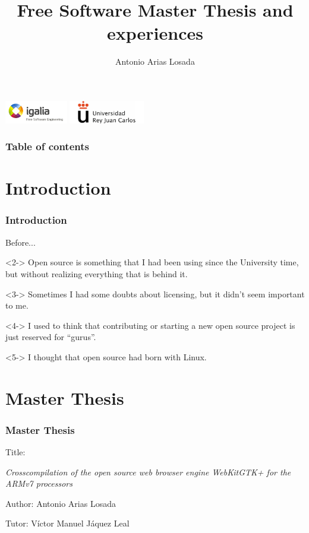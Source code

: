 \documentclass[slidestop,compress,mathserif]{beamer}
\title[Master Thesis and experiences]
{Free Software Master Thesis and experiences}
\author[Autores abreviados]{Antonio Arias Losada}
\institute{Free Software Master - 2011/2012}
\begin{document}
\begin{frame}
  \titlepage
  \begin{center}
    \includegraphics[height=1cm]{images/igalia.png}
    \hspace{10mm}
    \includegraphics[height=1cm]{images/urjc.png}
  \end{center}
\end{frame}

\begin{frame}
  \frametitle{Table of contents}

  \tableofcontents[hideallsubsections]
\end{frame}


\section{Introduction}
\begin{frame}
  \frametitle{Introduction}

  Before...

  \begin{block}{}<2->
    Open source is something that I had been using since the University time, but without realizing everything that is behind it.
  \end{block}

  \begin{block}{}<3->
    Sometimes I had some doubts about licensing, but it didn't seem important to me.
  \end{block}

  \begin{block}{}<4->
    I used to think that contributing or starting a new open source project is just reserved for ``gurus''.
  \end{block}

  \begin{block}{}<5->
    I thought that open source had born with Linux.
  \end{block}
\end{frame}

\section{Master Thesis}
\begin{frame}
  \frametitle{Master Thesis}

  Title:
  \begin{center}
    \textit{Crosscompilation of the open source web browser engine WebKitGTK+ for the ARMv7 processors}
  \end{center}

  Author:
  Antonio Arias Losada

  Tutor:
  V\'ictor Manuel J\'aquez Leal

\end{frame}
\end{document}

